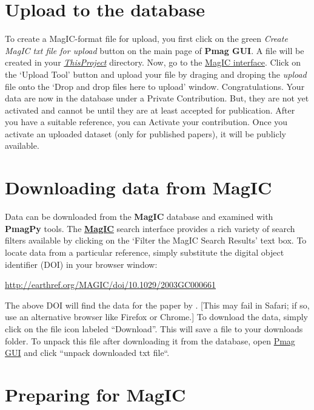 \documentclass[11pt]{book}
\begin{document}
{{

\section{Upload to the database }

To create a MagIC-format file for upload, you first click on the green {\it Create MagIC txt file for upload} button on the main page of {\bf Pmag GUI}. A file will be created in your \href{#Project_Directory}{\it ThisProject} directory.  Now, go to the  \href{http://earthref.org/MAGIC/}{MagIC  interface}.      Click on the `Upload Tool' button and upload your file by  draging and droping the {\it upload}   file onto the  `Drop and drop files here to upload' window.
Congratulations. Your data are now in the database under a Private Contribution.  But, they are not yet activated and cannot be until they are at least accepted for publication.  After you have a suitable reference, you can Activate your contribution.  Once you activate an uploaded dataset (only for published papers), it will be publicly available.


\section{Downloading data from {\bf MagIC}}

Data can be downloaded from the {\bf MagIC} database and examined with {\bf PmagPy} tools.   The \href{http://earthref.org/MAGIC/search/}{\bf MagIC} search interface provides a rich variety of search filters available by clicking on the `Filter the MagIC Search Results' text box.    To locate data from a particular reference,  simply substitute the digital object identifier (DOI) in your browser window:

\href{http://earthref.org/MAGIC/doi/10.1029/2003GC000661}{http://earthref.org/MAGIC/doi/10.1029/2003GC000661}

\noindent The above DOI will find the data for the paper by \cite{tauxe04b}.  [This may fail in Safari; if so, use an alternative browser like Firefox or Chrome.]     To download the data, simply click on the file icon labeled ``Download''.  This will save a file to your downloads folder.
 To unpack this file after downloading it from the database, open \href{#pmag_gui.py}{Pmag GUI} and click ``unpack downloaded txt file``.


 \section{Preparing for MagIC}

}}
\end{document}

